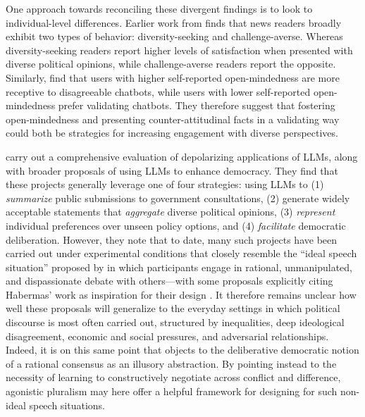 \documentclass{article}
\begin{document}
One approach towards reconciling these divergent findings is to look to individual-level differences. Earlier work from \textcite{Munson2010PresentingDP} finds that news readers broadly exhibit two types of behavior: diversity-seeking and challenge-averse. Whereas diversity-seeking readers report higher levels of satisfaction when presented with diverse political opinions, while challenge-averse readers report the opposite. Similarly, \textcite{Rathje2025SycophanticAI} find that users with higher self-reported open-mindedness are more receptive to disagreeable chatbots, while users with lower self-reported open-mindedness prefer validating chatbots. They therefore suggest that fostering open-mindedness and presenting counter-attitudinal facts in a validating way could both be strategies for increasing engagement with diverse perspectives.

\textcite{Lazar2026UsingLL} carry out a comprehensive evaluation of depolarizing applications of LLMs, along with broader proposals of using LLMs to enhance democracy. They find that these projects generally leverage one of four strategies: using LLMs to (1) \textit{summarize} public submissions to government consultations, (2) generate widely acceptable statements that \textit{aggregate} diverse political opinions, (3) \textit{represent} individual preferences over unseen policy options, and (4) \textit{facilitate} democratic deliberation. However, they note that to date, many such projects have been carried out under experimental conditions that closely resemble the ``ideal speech situation'' proposed by \textcite{Habermas1985TheoryOC} in which participants engage in rational, unmanipulated, and dispassionate debate with others---with some proposals explicitly citing Habermas' work as inspiration for their design \parencite{Tessler2024HabermasMachine}. It therefore remains unclear how well these proposals will generalize to the everyday settings in which political discourse is most often carried out, structured by inequalities, deep ideological disagreement, economic and social pressures, and adversarial relationships. Indeed, it is on this same point that \textcite{Mouffe2000DemocraticParadox} objects to the deliberative democratic notion of a rational consensus as an illusory abstraction. By pointing instead to the necessity of learning to constructively negotiate across conflict and difference, agonistic pluralism may here offer a helpful framework for designing for such non-ideal speech situations.
\end{document}
